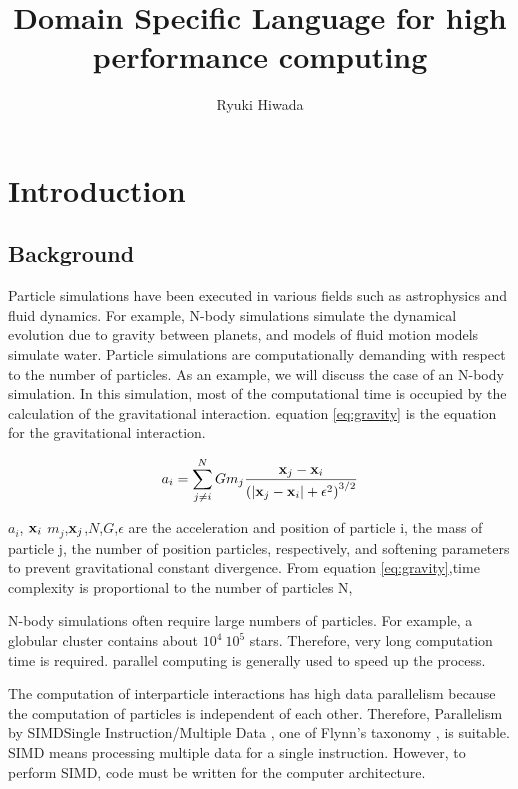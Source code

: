 \documentclass[ams]{article}
\author{Ryuki Hiwada}
\title{Domain Specific Language for high performance computing}
\begin{document}
\maketitle
\begin{abstract}

\end{abstract}
\section{Introduction}


\subsection{Background}

Particle simulations have been executed in various fields such as 
astrophysics and fluid dynamics. For example, N-body simulations 
simulate the dynamical evolution due to gravity between planets,
and models of fluid motion models simulate water.
Particle simulations are computationally demanding
with respect to the number of particles.
As an example, we will discuss the case of an N-body simulation.
In this simulation, most of the computational time is occupied by
the calculation of the gravitational interaction. equation \eqref{eq:gravity} is 
the equation for the gravitational interaction.

\begin{equation}
a_i = \sum_{\substack{j \neq i}}^{N} G m_j \frac{\vb{x}_j - \vb{x}_i}{\left( \left| \vb{x}_j - \vb{x}_i \right| + \epsilon^2 \right)^{3/2}\label{eq:gravity}}
\end{equation}

$a_i$, $\vb{x}_i$ $m_j$,$\vb{x}_j$,$N$,$G$,$\epsilon$
are the acceleration and position of particle i, the mass of particle j, the number of position particles, respectively, and
softening parameters to prevent gravitational constant divergence.
From equation \eqref{eq:gravity},time complexity is proportional to 
the number of particles N, 

 N-body simulations often require large numbers of particles.
For example, a globular cluster contains about $10^4 ~ 10^5 $ stars.
Therefore, very long computation time is required.  parallel computing is 
generally used to speed up the process.


The computation of interparticle interactions has high
data parallelism because the computation of particles is 
independent of each other. Therefore, 
Parallelism by SIMD\lparen Single Instruction/Multiple Data \rparen, 
one of Flynn's taxonomy \cite{flynn1972some} , is suitable.
SIMD means processing multiple data for a single instruction.
However, to perform SIMD, code must be written for the computer architecture.
\end{document}
